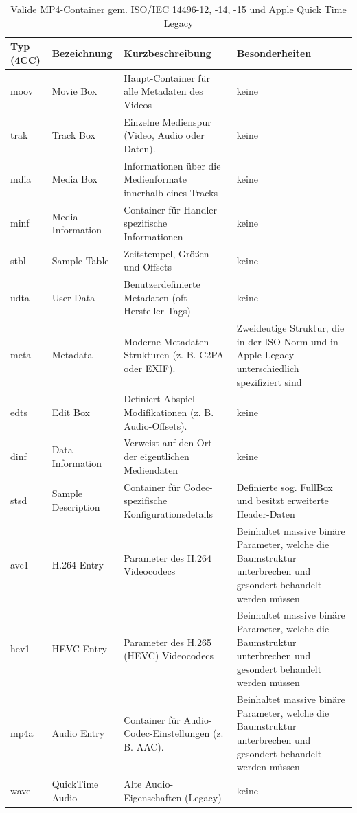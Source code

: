 \begin{table}[h]
    \centering
\caption{Valide MP4-Container gem. ISO/IEC 14496-12, -14, -15 und Apple Quick Time Legacy}
\label{tab:mp4allowlisting}
    \begin{tabular}{|l|p{2.5cm}|p{5.5cm}|p{5.5cm}|}\hline
         \textbf{Typ (4CC)}&  \textbf{Bezeichnung}&\textbf{Kurzbeschreibung}&\textbf{Besonderheiten}
\\\hline
         moov&  Movie Box&Haupt-Container für alle Metadaten des Videos& keine\\\hline
         trak&  Track Box&Einzelne Medienspur (Video, Audio oder Daten).& keine\\\hline
         mdia&  Media Box&Informationen über die Medienformate innerhalb eines Tracks& keine\\\hline
         minf&  Media Information&Container für Handler-spezifische Informationen& keine\\\hline
         stbl&  Sample Table&Zeitstempel, Größen und Offsets& keine\\\hline
         udta&  User Data&Benutzerdefinierte Metadaten (oft Hersteller-Tags)& keine\\\hline
         meta&  Metadata&Moderne Metadaten-Strukturen (z. B. C2PA oder EXIF).& Zweideutige Struktur, die in der ISO-Norm und in Apple-Legacy unterschiedlich spezifiziert sind\\\hline
         edts&  Edit Box&Definiert Abspiel-Modifikationen (z. B. Audio-Offsets).& keine\\\hline
         dinf&  Data Information&Verweist auf den Ort der eigentlichen Mediendaten& keine\\\hline
 stsd& Sample Description&Container für Codec-spezifische Konfigurationsdetails& Definierte sog. FullBox und besitzt erweiterte Header-Daten\\\hline
 avc1& H.264 Entry&Parameter des H.264 Videocodecs&Beinhaltet massive binäre Parameter, welche die Baumstruktur unterbrechen und gesondert behandelt werden müssen\\\hline
 hev1& HEVC Entry&Parameter des H.265 (HEVC) Videocodecs&Beinhaltet massive binäre Parameter, welche die Baumstruktur unterbrechen und gesondert behandelt werden müssen\\\hline
 mp4a& Audio Entry&Container für Audio-Codec-Einstellungen (z. B. AAC).&Beinhaltet massive binäre Parameter, welche die Baumstruktur unterbrechen und gesondert behandelt werden müssen\\\hline
 wave& QuickTime Audio&Alte Audio-Eigenschaften (Legacy)& keine\\\hline

\end{tabular}
\end{table}
